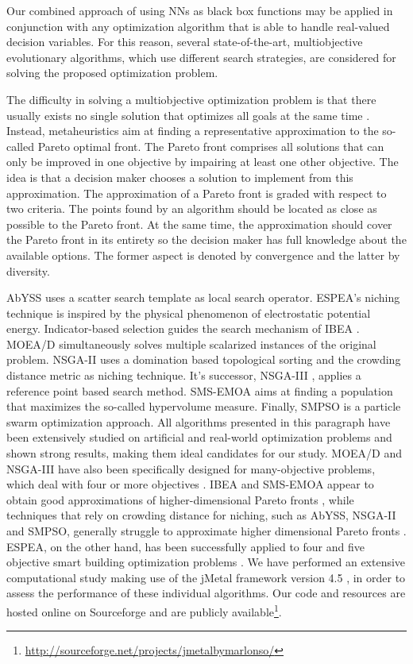Our combined approach of using NNs as black box functions may be applied in conjunction with any optimization algorithm that is able to handle real-valued decision variables. For this reason, several state-of-the-art, multiobjective evolutionary algorithms, which use different search strategies, are considered for solving the proposed optimization problem.

The difficulty in solving a multiobjective optimization problem is that there usually exists no single solution that optimizes all goals at the same time \cite{basicDeb,basicCoello}. Instead, metaheuristics aim at finding a representative approximation to the so-called Pareto optimal front. The Pareto front comprises all solutions that can only be improved in one objective by impairing at least one other objective. The idea is that a decision maker chooses a solution to implement from this approximation. The approximation of a Pareto front is graded with respect to two criteria. The points found by an algorithm should be located as close as possible to the Pareto front. At the same time, the approximation should cover the Pareto front in its entirety so the decision maker has full knowledge about the available options. The former aspect is denoted by convergence and the latter by diversity.

AbYSS \cite{abyss} uses a scatter search template as local search operator. ESPEA's \cite{espea} niching technique is inspired by the physical phenomenon of electrostatic potential energy. Indicator-based selection guides the search mechanism of IBEA \cite{ibea}. MOEA/D \cite{moead2009} simultaneously solves multiple scalarized instances of the original problem. NSGA-II \cite{nsga2} uses a domination based topological sorting and the crowding distance metric as niching technique. It's successor, NSGA-III \cite{nsga3part1}, applies a reference point based search method. SMS-EMOA \cite{smsemoa} aims at finding a population that maximizes the so-called hypervolume measure. Finally, SMPSO \cite{smpso} is a particle swarm optimization approach. All algorithms presented in this paragraph have been extensively studied on artificial and real-world optimization problems and shown strong results, making them ideal candidates for our study. MOEA/D and NSGA-III have also been specifically designed for many-objective problems, which deal with four or more objectives \cite{ishibuchi2008evolutionary}. IBEA and SMS-EMOA appear to obtain good approximations of higher-dimensional Pareto fronts \cite{wagner2007pareto}, while techniques that rely on crowding distance for niching, such as AbYSS, NSGA-II and SMPSO, generally struggle to approximate higher dimensional Pareto fronts \cite{kukkonen2006improved} . ESPEA, on the other hand, has been successfully applied to four and five objective smart building optimization problems \cite{braun2016smartbuilding}.
%
We have performed an extensive computational study making use of the jMetal framework version 4.5 \cite{jmetal2}, in order to assess the performance of these individual algorithms. Our code and resources are hosted online on Sourceforge and are publicly available\footnote{\url{http://sourceforge.net/projects/jmetalbymarlonso/}}.

